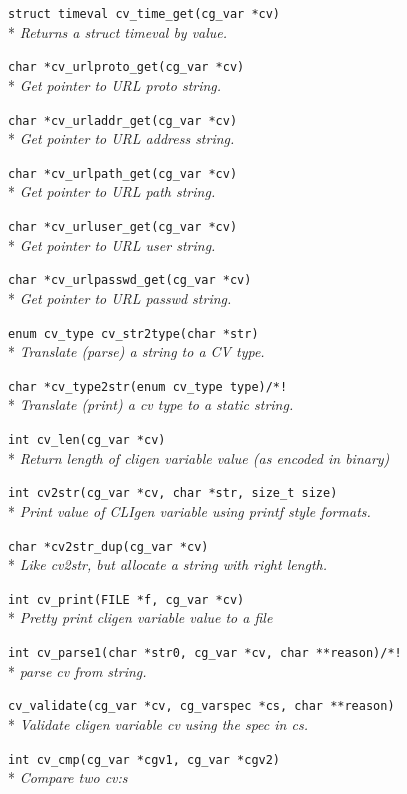 \documentclass[a4paper, 10pt] {article}
\begin{document}
{{\tt struct timeval cv\_time\_get(cg\_var *cv)}\\*
\emph{ Returns a struct timeval by value.}

{\tt char *cv\_urlproto\_get(cg\_var *cv)}\\*
\emph{  Get pointer to URL proto string. }

{\tt char *cv\_urladdr\_get(cg\_var *cv)}\\*
\emph{  Get pointer to URL address string. }

{\tt char *cv\_urlpath\_get(cg\_var *cv)}\\*
\emph{  Get pointer to URL path string. }

{\tt char *cv\_urluser\_get(cg\_var *cv)}\\*
\emph{  Get pointer to URL user string. }

{\tt char *cv\_urlpasswd\_get(cg\_var *cv)}\\*
\emph{  Get pointer to URL passwd string. }

{\tt enum cv\_type cv\_str2type(char *str)}\\*
\emph{ Translate (parse) a string to a CV type.}

{\tt char *cv\_type2str(enum cv\_type type)/*! }\\*
\emph{ Translate (print) a cv type to a static string.}

{\tt int cv\_len(cg\_var *cv)}\\*
\emph{  Return length of cligen variable value (as encoded in binary)}

{\tt int cv2str(cg\_var *cv, char *str, size\_t size)}\\*
\emph{ Print value of CLIgen variable using printf style formats.}

{\tt char *cv2str\_dup(cg\_var *cv)}\\*
\emph{ Like cv2str, but allocate a string with right length.}

{\tt int cv\_print(FILE *f, cg\_var *cv)}\\*
\emph{ Pretty print cligen variable value to a file}

{\tt int cv\_parse1(char *str0, cg\_var *cv, char **reason)/*! }\\*
\emph{ parse cv from string. }

{\tt cv\_validate(cg\_var *cv, cg\_varspec *cs, char **reason)}\\*
\emph{  Validate cligen variable cv using the spec in cs.}

{\tt int cv\_cmp(cg\_var *cgv1, cg\_var *cgv2)}\\*
\emph{ Compare two cv:s}

}
\end{document}
